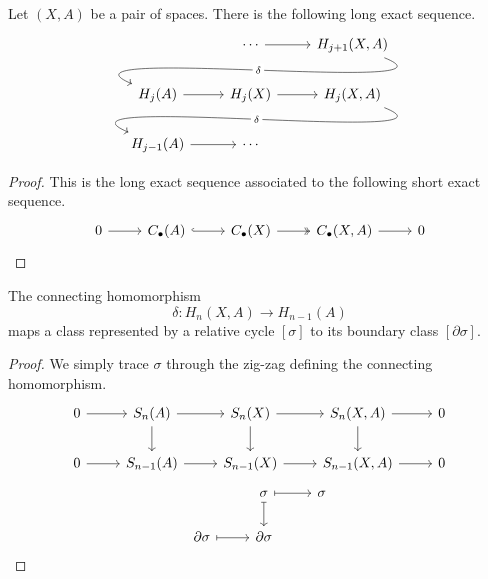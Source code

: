 \documentclass[main.tex]{subfiles}
\begin{document}
\begin{proposition}
  \label{prop:les_on_a_pair_of_spaces}
  Let $(X, A)$ be a pair of spaces. There is the following long exact sequence.
  \begin{equation*}
    \begin{tikzcd}
      & \cdots
      \arrow[r]
      & H_{j+1}(X, A)
      \\
      H_{j}(A)
      \arrow[from=urr, out=-22, in=157, looseness=1, overlay, "\delta" description]
      \arrow[r,]
      & H_{j}(X)
      \arrow[r,]
      & H_{j}(X, A)
      \\
      H_{j-1}(A)
      \arrow[r]
      \arrow[from=urr, out=-22, in=157, looseness=1, overlay, "\delta" description]
      & \cdots
    \end{tikzcd}
  \end{equation*}
\end{proposition}
\begin{proof}
  This is the long exact sequence associated to the following short exact sequence.
  \begin{equation*}
    \begin{tikzcd}
      0
      \arrow[r]
      & C_{\bullet}(A)
      \arrow[r, hook]
      & C_{\bullet}(X)
      \arrow[r, two heads]
      & C_{\bullet}(X, A)
      \arrow[r]
      & 0
    \end{tikzcd}
  \end{equation*}
\end{proof}

\begin{proposition}
  The connecting homomorphism
  \begin{equation*}
    \delta\colon H_{n}(X, A) \to H_{n-1}(A)
  \end{equation*}
  maps a class represented by a relative cycle \([\sigma]\) to its boundary class \([\partial \sigma]\).
\end{proposition}
\begin{proof}
  We simply trace \(\sigma\) through the zig-zag defining the connecting homomorphism.
  \begin{equation*}
    \begin{tikzcd}
      0
      \arrow[r]
      & S_{n}(A)
      \arrow[r]
      \arrow[d]
      & S_{n}(X)
      \arrow[r]
      \arrow[d]
      & S_{n}(X, A)
      \arrow[r]
      \arrow[d]
      & 0
      \\
      0
      \arrow[r]
      & S_{n-1}(A)
      \arrow[r]
      & S_{n-1}(X)
      \arrow[r]
      & S_{n-1}(X, A)
      \arrow[r]
      & 0
    \end{tikzcd}
  \end{equation*}
  \begin{equation*}
    \begin{tikzcd}
      & \sigma
      \arrow[r, mapsto]
      \arrow[d, mapsto]
      & \sigma
      \\
      \partial \sigma
      \arrow[r, mapsto]
      & \partial \sigma
    \end{tikzcd}
  \end{equation*}
\end{proof}
\end{document}
